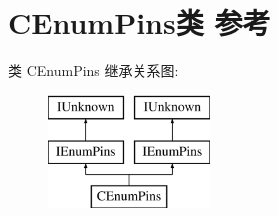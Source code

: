 \hypertarget{class_c_enum_pins}{}\section{C\+Enum\+Pins类 参考}
\label{class_c_enum_pins}
类 C\+Enum\+Pins 继承关系图\+:\begin{figure}[H]
\begin{center}
\leavevmode
\includegraphics[height=3.000000cm]{class_c_enum_pins}
\end{center}
\end{figure}
